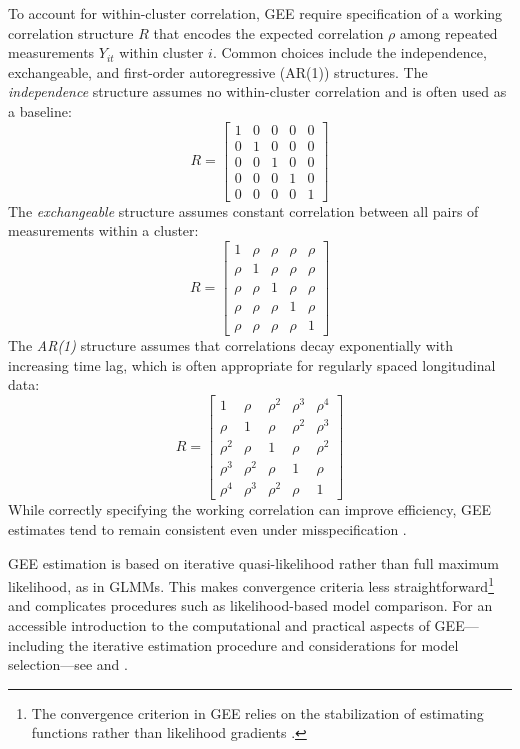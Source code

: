 To account for within-cluster correlation, GEE require specification of a working correlation structure \( R \) that encodes the expected correlation \( \rho \) among repeated measurements \( Y_{it} \) within cluster \( i \). Common choices include the independence, exchangeable, and first-order autoregressive (AR(1)) structures. The \textit{independence} structure assumes no within-cluster correlation and is often used as a baseline:
\[
R = 
\begin{bmatrix}
1 & 0 & 0 & 0 & 0 \\
0 & 1 & 0 & 0 & 0 \\
0 & 0 & 1 & 0 & 0 \\
0 & 0 & 0 & 1 & 0 \\
0 & 0 & 0 & 0 & 1
\end{bmatrix}
\]
The \textit{exchangeable} structure assumes constant correlation between all pairs of measurements within a cluster:
\[
R = 
\begin{bmatrix}
1 & \rho & \rho & \rho & \rho \\
\rho & 1 & \rho & \rho & \rho \\
\rho & \rho & 1 & \rho & \rho \\
\rho & \rho & \rho & 1 & \rho \\
\rho & \rho & \rho & \rho & 1
\end{bmatrix}
\]
The \textit{AR(1)} structure assumes that correlations decay exponentially with increasing time lag, which is often appropriate for regularly spaced longitudinal data:
\[
R = 
\begin{bmatrix}
1 & \rho & \rho^2 & \rho^3 & \rho^4 \\
\rho & 1 & \rho & \rho^2 & \rho^3 \\
\rho^2 & \rho & 1 & \rho & \rho^2 \\
\rho^3 & \rho^2 & \rho & 1 & \rho \\
\rho^4 & \rho^3 & \rho^2 & \rho & 1
\end{bmatrix}
\]
While correctly specifying the working correlation can improve efficiency, GEE estimates tend to remain consistent even under misspecification \parencite{zeger_models_1988, ballinger_using_2004}.

GEE estimation is based on iterative quasi-likelihood rather than full maximum likelihood, as in GLMMs. This makes convergence criteria less straightforward\footnote{The convergence criterion in GEE relies on the stabilization of estimating functions rather than likelihood gradients \parencite[p. 92]{hardin_generalized_2012}.} and complicates procedures such as likelihood-based model comparison. For an accessible introduction to the computational and practical aspects of GEE—including the iterative estimation procedure and considerations for model selection—see \textcite{mcneish_unnecessary_2017} and \textcite{ballinger_using_2004}.

